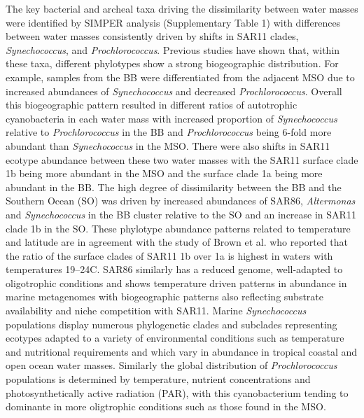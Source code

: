 The key bacterial and archeal taxa driving the dissimilarity between water masses were identified by SIMPER analysis (Supplementary Table 1) with differences between water masses consistently driven by shifts in SAR11 clades, {\em Synechococcus}, and {\em Prochlorococcus}. Previous studies have shown that, within these taxa, different phylotypes show a strong biogeographic distribution. \cite{brown_trait_2014} For example, samples from the BB were differentiated from the adjacent MSO due to increased abundances of {\em Synechococcus} and decreased {\em Prochlorococcus}. Overall this biogeographic pattern resulted in different ratios of autotrophic cyanobacteria in each water mass with increased proportion of {\em Synechococcus} relative to {\em Prochlorococcus} in the BB and {\em Prochlorococcus} being 6-fold more abundant than {\em Synechococcus} in the MSO. There were also shifts in SAR11 ecotype abundance between these two water masses with the SAR11 surface clade 1b being more abundant in the MSO and the surface clade 1a being more abundant in the BB. The high degree of dissimilarity between the BB and the Southern Ocean (SO) was driven by increased abundances of SAR86, {\em Altermonas} and {\em Synechococcus} in the BB cluster relative to the SO and an increase in SAR11 clade 1b in the SO. These phylotype abundance patterns related to temperature and latitude are in agreement with the study of Brown et al. \cite{brown_global_2012} who reported that the ratio of the surface clades of SAR11 1b over 1a is highest in waters with temperatures 19–24\degree C. \cite{brown_global_2012} SAR86 similarly has a reduced genome, well-adapted to oligotrophic conditions and shows temperature driven patterns in abundance in marine metagenomes \cite{dupont_genomic_2012} with biogeographic patterns also reflecting substrate availability and niche competition with SAR11. \cite{dupont_genomic_2012} Marine {\em Synechococcus} populations display numerous phylogenetic clades and subclades \cite{mazard_multi-locus_2012} representing ecotypes adapted to a variety of environmental conditions such as temperature and nutritional requirements and which vary in abundance in tropical coastal and open ocean water masses. \cite{brown_trait_2014} Similarly the global distribution of {\em Prochlorococcus} populations is determined by temperature, nutrient concentrations and photosynthetically active radiation (PAR), with this cyanobacterium tending to dominante in more oligtrophic conditions \cite{brown_trait_2014} such as those found in the MSO.

